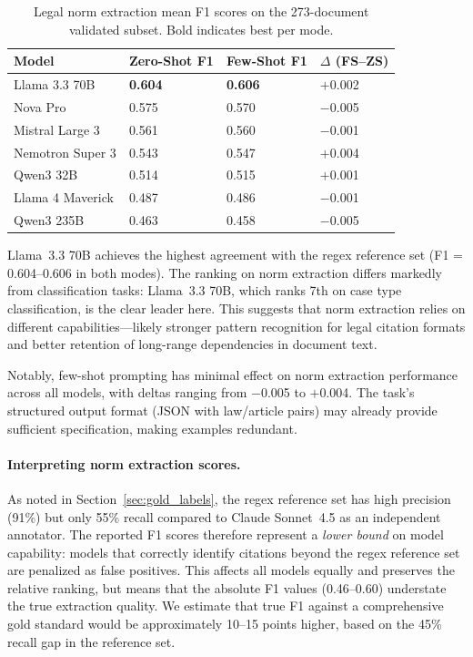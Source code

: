 \documentclass[11pt,a4paper]{article}
\begin{document}
\begin{table}[t]
\centering
\caption{Legal norm extraction mean F1 scores on the 273-document validated subset. Bold indicates best per mode.}
\label{tab:norm_extraction}
\begin{tabular}{lR{2.0cm}R{2.0cm}R{2.0cm}}
\toprule
\textbf{Model} & \textbf{Zero-Shot F1} & \textbf{Few-Shot F1} & \textbf{$\Delta$ (FS--ZS)} \\
\midrule
Llama 3.3 70B     & \textbf{0.604} & \textbf{0.606} & $+$0.002 \\
Nova Pro          & 0.575          & 0.570          & $-$0.005 \\
Mistral Large 3   & 0.561          & 0.560          & $-$0.001 \\
Nemotron Super 3  & 0.543          & 0.547          & $+$0.004 \\
Qwen3 32B         & 0.514          & 0.515          & $+$0.001 \\
Llama 4 Maverick  & 0.487          & 0.486          & $-$0.001 \\
Qwen3 235B        & 0.463          & 0.458          & $-$0.005 \\
\bottomrule
\end{tabular}
\end{table}

Llama~3.3 70B achieves the highest agreement with the regex reference set (F1 = 0.604--0.606 in both modes). The ranking on norm extraction differs markedly from classification tasks: Llama~3.3 70B, which ranks 7th on case type classification, is the clear leader here. This suggests that norm extraction relies on different capabilities---likely stronger pattern recognition for legal citation formats and better retention of long-range dependencies in document text.

Notably, few-shot prompting has minimal effect on norm extraction performance across all models, with deltas ranging from $-$0.005 to $+$0.004. The task's structured output format (JSON with law/article pairs) may already provide sufficient specification, making examples redundant.

\paragraph{Interpreting norm extraction scores.} As noted in Section~\ref{sec:gold_labels}, the regex reference set has high precision (91\%) but only 55\% recall compared to Claude Sonnet~4.5 as an independent annotator. The reported F1 scores therefore represent a \emph{lower bound} on model capability: models that correctly identify citations beyond the regex reference set are penalized as false positives. This affects all models equally and preserves the relative ranking, but means that the absolute F1 values (0.46--0.60) understate the true extraction quality. We estimate that true F1 against a comprehensive gold standard would be approximately 10--15 points higher, based on the 45\% recall gap in the reference set.
\end{document}
